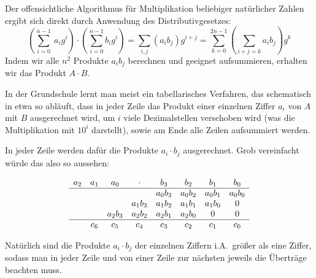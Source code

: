 \begin{remark}
    Der offensichtliche Algorithmus für Multiplikation beliebiger natürlicher Zahlen ergibt sich direkt durch Anwendung des Distributivgesetzes:
    \[\left(\sum_{i=0}^{n-1}\ a_i g^i \right)\cdot\left(\sum_{i=0}^{n-1} b_i g^i\right) = \sum_{i,j} (a_i b_j) g^{i+j} = \sum_{k=0}^{2n-1} \left(\sum_{i+j=k}a_i b_j\right)g^k\]
    Indem wir alle $n^2$ Produkte $a_i b_j$ berechnen und geeignet aufsummieren, erhalten wir das Produkt $A\cdot B$.

    \medskip
    In der Grundschule lernt man meist ein tabellarisches Verfahren, das schematisch in etwa so abläuft, dass in jeder Zeile das Produkt einer einzelnen Ziffer $a_i$ von $A$ mit $B$ ausgerechnet wird, um $i$ viele Dezimalstellen verschoben wird (was die Multiplikation mit $10^i$ darstellt), sowie am Ende alle Zeilen aufsummiert werden.

    \smallskip
    In jeder Zeile werden dafür die Produkte $a_i\cdot b_j$ ausgerechnet. Grob vereinfacht würde das also so aussehen:

    \[\begin{array}{c c c c c c c c}
        a_2 & a_1 & a_0     & \cdot   & b_3     & b_2     & b_1     & b_0     \\
        \hline
        &     &         &         & a_0 b_3 & a_0 b_2 & a_0 b_1 & a_0 b_0 \\
        &     &         & a_1 b_3 & a_1 b_2 & a_1 b_1 & a_1 b_0 & 0       \\
        &     & a_2 b_3 & a_2 b_2 & a_2 b_1 & a_2 b_0 & 0       & 0       \\
        \hline
        & c_6 & c_5     & c_4     & c_3     & c_2     & c_1     & c_0
    \end{array}\]

    Natürlich sind die Produkte $a_i\cdot b_j$ der einzelnen Ziffern i.A.\ größer als eine Ziffer, sodass man in jeder Zeile und von einer Zeile zur nächsten jeweils die Überträge beachten muss.
\end{remark}

